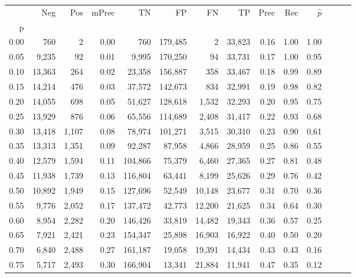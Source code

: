 \begin{tabular}{rrrrrrrrrrrrrr}
\toprule
{} &     Neg &    Pos & mPrec &       TN &       FP &      FN &      TP &  Prec &   Rec & $\hat{p}$ \\
p    &         &        &       &          &          &         &         &       &       &           \\
\midrule
0.00 &     760 &      2 &  0.00 &      760 &  179,485 &       2 &  33,823 &  0.16 &  1.00 &      1.00 \\
0.05 &   9,235 &     92 &  0.01 &    9,995 &  170,250 &      94 &  33,731 &  0.17 &  1.00 &      0.95 \\
0.10 &  13,363 &    264 &  0.02 &   23,358 &  156,887 &     358 &  33,467 &  0.18 &  0.99 &      0.89 \\
0.15 &  14,214 &    476 &  0.03 &   37,572 &  142,673 &     834 &  32,991 &  0.19 &  0.98 &      0.82 \\
0.20 &  14,055 &    698 &  0.05 &   51,627 &  128,618 &   1,532 &  32,293 &  0.20 &  0.95 &      0.75 \\
0.25 &  13,929 &    876 &  0.06 &   65,556 &  114,689 &   2,408 &  31,417 &  0.22 &  0.93 &      0.68 \\
0.30 &  13,418 &  1,107 &  0.08 &   78,974 &  101,271 &   3,515 &  30,310 &  0.23 &  0.90 &      0.61 \\
0.35 &  13,313 &  1,351 &  0.09 &   92,287 &   87,958 &   4,866 &  28,959 &  0.25 &  0.86 &      0.55 \\
0.40 &  12,579 &  1,594 &  0.11 &  104,866 &   75,379 &   6,460 &  27,365 &  0.27 &  0.81 &      0.48 \\
0.45 &  11,938 &  1,739 &  0.13 &  116,804 &   63,441 &   8,199 &  25,626 &  0.29 &  0.76 &      0.42 \\
0.50 &  10,892 &  1,949 &  0.15 &  127,696 &   52,549 &  10,148 &  23,677 &  0.31 &  0.70 &      0.36 \\
0.55 &   9,776 &  2,052 &  0.17 &  137,472 &   42,773 &  12,200 &  21,625 &  0.34 &  0.64 &      0.30 \\
0.60 &   8,954 &  2,282 &  0.20 &  146,426 &   33,819 &  14,482 &  19,343 &  0.36 &  0.57 &      0.25 \\
0.65 &   7,921 &  2,421 &  0.23 &  154,347 &   25,898 &  16,903 &  16,922 &  0.40 &  0.50 &      0.20 \\
0.70 &   6,840 &  2,488 &  0.27 &  161,187 &   19,058 &  19,391 &  14,434 &  0.43 &  0.43 &      0.16 \\
0.75 &   5,717 &  2,493 &  0.30 &  166,904 &   13,341 &  21,884 &  11,941 &  0.47 &  0.35 &      0.12 \\

\end{tabular}
